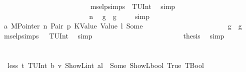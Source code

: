 \begin{isabellebody}
\ \ \ \ \ \ \ \ \ \ \ \ \ \ \ \ \ \ \ \ \ \ \ \ \isamarkupfalse%
\ msel{\isachardot}{\kern0pt}psimps{\isacharparenleft}{\kern0pt}{}{\isacharparenright}{\kern0pt}\ {}{\isacharparenleft}{\kern0pt}{}{\isacharparenright}{\kern0pt}\ TUInt\ \isamarkupfalse%
\ simp\isanewline
\ \ \ \ \ \ \ \ \ \ \ \ \ \ \ \ \ \ \ \ \ \ \isamarkupfalse%
\ \isamarkupfalse%
\ n\ \isamarkupfalse%
\ {\isachardoublequoteopen}g{\isacharprime}{\kern0pt}\ {\isasymle}\ g{\isachardoublequoteclose}\ \isamarkupfalse%
\ {}{\isacharparenleft}{\kern0pt}{}{\isacharparenright}{\kern0pt}\ \isamarkupfalse%
\ simp\isanewline
\ \ \ \ \ \ \ \ \ \ \ \ \ \ \ \ \ \ \ \ \ \ \isamarkupfalse%
\ \isamarkupfalse%
\ a{}\ MPointer\ n\ Pair\ p{}\ KValue\ Value\ l\ Some\isanewline
\ \ \ \ \ \ \ \ \ \ \ \ \ \ \ \ \ \ \ \ \ \ \isamarkupfalse%
\ {\isachardoublequoteopen}g{}{\isacharprime}{\kern0pt}\ {\isasymle}\ g{\isacharprime}{\kern0pt}{\isachardoublequoteclose}\ \isamarkupfalse%
\ msel{\isachardot}{\kern0pt}psimps{\isacharparenleft}{\kern0pt}{}{\isacharparenright}{\kern0pt}\ {}{\isacharparenleft}{\kern0pt}{}{\isacharparenright}{\kern0pt}\ {}{\isacharparenleft}{\kern0pt}{}{\isacharparenright}{\kern0pt}\ TUInt\ \isamarkupfalse%
\ simp\isanewline
\ \ \ \ \ \ \ \ \ \ \ \ \ \ \ \ \ \ \ \ \ \ \isamarkupfalse%
\ \isamarkupfalse%
\ {\isacharquery}{\kern0pt}thesis\ \isamarkupfalse%
\ simp\isanewline
\ \ \ \ \ \ \ \ \ \ \ \ \ \ \ \ \ \ \ \ \isamarkupfalse%
\isanewline
\ \ \ \ \ \ \ \ \ \ \ \ \ \ \ \ \ \ \isamarkupfalse%
\isanewline
\ \ \ \ \ \ \ \ \ \ \ \ \ \ \ \ \isamarkupfalse%
\isanewline
\ \ \ \ \ \ \ \ \ \ \ \ \ \ \ \ \ \ \isamarkupfalse%
\ {\isachardoublequoteopen}{\isasymnot}\ less\ t{\isacharprime}{\kern0pt}\ {\isacharparenleft}{\kern0pt}TUInt\ b{}{}{}{\isacharparenright}{\kern0pt}\ v\ {\isacharparenleft}{\kern0pt}ShowL\isactrlsub i\isactrlsub n\isactrlsub t\ al{\isacharparenright}{\kern0pt}\ {\isacharequal}{\kern0pt}\ Some\ {\isacharparenleft}{\kern0pt}ShowL\isactrlsub b\isactrlsub o\isactrlsub o\isactrlsub l\ True{\isacharcomma}{\kern0pt}\ TBool{\isacharparenright}{\kern0pt}{\isachardoublequoteclose}\isanewline

\end{isabellebody}
